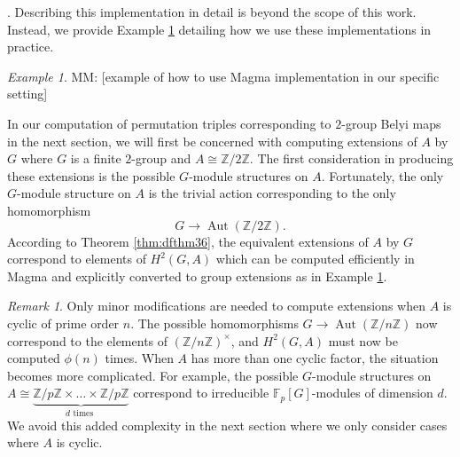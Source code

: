 \documentclass{dcthesis}
\newcommand{\ZZ}{\mathbb Z}
\newcommand{\mm}[1]{{\color{blue} \sf MM: [#1]}}
\newcommand{\FF}{\mathbb{F}}
\DeclareMathOperator{\Aut}{Aut}
\theoremstyle{definition}
\theoremstyle{remark}
\newtheorem{remark}[prop]{Remark}
\newtheorem{example}[prop]{Example}
\numberwithin{equation}{section}
\numberwithin{figure}{section}
\begin{document}
{{    \cite[Cohomology and group extensions]{magmabook}.
    Describing this implementation in detail is beyond the scope of this work.
    Instead, we provide
    Example \ref{exm:magmaH2example}
    detailing how we use these
    implementations in practice.
    \begin{example}
      \label{exm:magmaH2example}
      \mm{example of how to use \textsf{Magma} implementation in our specific setting}
    \end{example}
    In our computation of permutation triples
    corresponding to $2$-group Belyi maps
    in the next section,
    we will first be concerned with computing
    extensions of $A$ by $G$
    where $G$ is a finite $2$-group
    and $A\cong\ZZ/2\ZZ$.
    The first consideration in producing these
    extensions is the possible $G$-module
    structures on $A$.
    Fortunately,
    the only $G$-module structure on $A$
    is the trivial action
    corresponding to the only
    homomorphism
    \begin{equation}
      \label{eqn:trivialGmodule}
      G\to\Aut(\ZZ/2\ZZ).
    \end{equation}
    According to Theorem
    \ref{thm:dfthm36},
    the equivalent extensions of $A$ by $G$
    correspond to elements of $H^2(G,A)$
    which can be computed efficiently
    in \textsf{Magma}
    and explicitly converted to
    group extensions
    as in Example \ref{exm:magmaH2example}.
    \begin{remark}
      \label{rmk:abelianconsiderations}
      Only minor modifications are
      needed to compute
      extensions when
      $A$ is cyclic of prime order $n$.
      The possible homomorphisms
      $
        G\to\Aut(\ZZ/n\ZZ)
      $
      now correspond to the elements
      of $(\ZZ/n\ZZ)^\times$,
      and $H^2(G,A)$ must now be computed
      $\phi(n)$ times.
      When $A$ has more than one cyclic factor,
      the situation becomes more complicated.
      For example,
      the possible $G$-module structures on
      $A\cong\underbrace{\ZZ/p\ZZ\times\dots\times\ZZ/p\ZZ}_{d\text{ times }}$
      correspond to
      irreducible $\FF_p[G]$-modules of dimension
      $d$.
      We avoid this added complexity in the next
      section where we only consider
      cases where $A$ is cyclic.
    \end{remark}
  }
}
\end{document}
